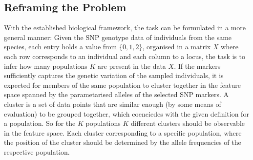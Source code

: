 \documentclass[a4paper, 11pt]{article}
\begin{document}


\subsection{Reframing the Problem}
With the established biological framework, the task can be formulated in a more general manner: Given the SNP genotype data of individuals from the same species, each entry holds a value from $\{0,1,2\}$, organised in a matrix $X$ where each row corresponds to an individual and each column to a locus, the task is to infer how many populations $K$ are present in the data $X$. If the markers sufficiently captures the genetic variation of the sampled individuals, it is expected for members of the same population to cluster together in the feature space spanned by the parametarised alleles of the selected SNP markers. A cluster is a set of data points that are similar enough (by some means of evaluation) to be grouped together, which coenciedes with the given definition for a population. So for the $K$ populations $K$ different clusters should be observable in the feature space. Each cluster corresponding to a specific population, where the position of the cluster should be determined by the allele frequencies of the respective population.\\
\end{document}
